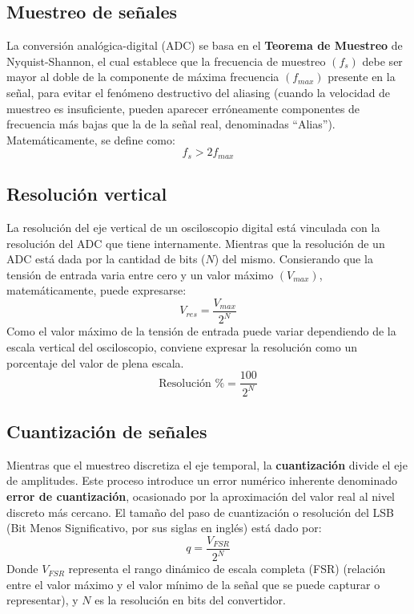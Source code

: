 \subsection{Muestreo de señales}
La conversión analógica-digital (ADC) se basa en el \textbf{Teorema de Muestreo} de Nyquist-Shannon, el cual establece que la frecuencia de muestreo $(f_s)$ debe ser mayor al doble de la componente de máxima frecuencia $(f_{max})$ presente en la señal, para evitar el fenómeno destructivo del aliasing (cuando la velocidad de muestreo es insuficiente, pueden aparecer erróneamente componentes de frecuencia más bajas que la de la señal real, denominadas “Alias”). Matemáticamente, se define como:
\begin{equation}
    f_s > 2 f_{max}
\end{equation}

\subsection{Resolución vertical}
La resolución del eje vertical de un osciloscopio digital está vinculada con la resolución del ADC que tiene internamente. 
Mientras que la resolución de un ADC está dada por la cantidad de bits ($N$) del mismo. Consierando que la tensión de entrada varia entre cero y un valor máximo $(V_{max})$, matemáticamente, puede expresarse:
\begin{equation}
    V_{res} = \dfrac{V_{max}}{2^N}
\end{equation}
Como el valor máximo de la tensión de entrada puede variar dependiendo de la escala vertical del osciloscopio, conviene expresar la resolución como un porcentaje del valor de plena escala.
\begin{equation}
    \text{Resolución \%} = \dfrac{100}{2^N}
\end{equation}

\subsection{Cuantización de señales}
Mientras que el muestreo discretiza el eje temporal, la \textbf{cuantización} divide el eje de amplitudes. Este proceso introduce un error numérico inherente denominado \textbf{error de cuantización}, ocasionado por la aproximación del valor real al nivel discreto más cercano. El tamaño del paso de cuantización o resolución del LSB (Bit Menos Significativo, por sus siglas en inglés) está dado por:
\begin{equation}
    q = \dfrac{V_{FSR}}{2^N}
\end{equation}
Donde $V_{FSR}$ representa el rango dinámico de escala completa (FSR) (relación entre el valor máximo y el valor mínimo de la señal que se puede capturar o representar), y $N$ es la resolución en bits del convertidor.

